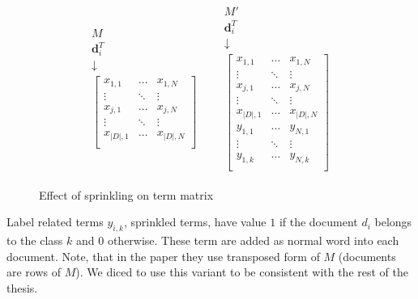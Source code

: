 \begin{figure}[h]
\centering
    \begin{equation*}
\begin{matrix} 
\begin{matrix} 
M  \\
\textbf{d}_i^T  \\
\downarrow \\
\begin{bmatrix}
x_{1,1}& \dots&  x_{1,N} \\
\vdots &  \ddots & \vdots \\
x_{j,1}& \dots & x_{j,N} \\
\vdots & \ddots & \vdots \\
x_{|D|,1} &\dots&  x_{|D|,N} \\
\end{bmatrix}
\end{matrix}
&
&
\begin{matrix} 
M'  \\
\textbf{d}_i^T  \\
\downarrow \\
\begin{bmatrix}
x_{1,1}& \dots&  x_{1,N} \\
\vdots &  \ddots & \vdots \\
x_{j,1}& \dots & x_{j,N} \\
\vdots & \ddots & \vdots \\
x_{|D|,1} &\dots&  x_{|D|,N} \\
\hline 
y_{1,1} &\dots&  y_{N,1} \\
\vdots & \ddots & \vdots \\
y_{1,k} &\dots&  y_{N,k} \\

\end{bmatrix}
\end{matrix}
\end{matrix}
\end{equation*}

\caption{Effect of sprinkling on term matrix}\label{fig:animals}
\end{figure}

    Label related terms $y_{i,k}$, sprinkled terms, have value $1$ if the document $d_i$ belongs to the class $k$ and $0$ otherwise.
    These term are added as normal word into each document.
    Note, that in the paper they use transposed form of $M$ (documents are rows of $M$).
    We diced to use this variant to be consistent with the rest of the thesis.
    
